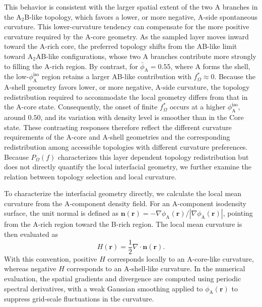This behavior is consistent with the larger spatial extent of the two A branches in the A$_2$B-like topology, which favors a lower, or more negative, A-side spontaneous curvature.
This lower-curvature tendency can compensate for the more positive curvature required by the A-core geometry.
As the sampled layer moves inward toward the A-rich core, the preferred topology shifts from the AB-like limit toward A$_2$AB-like configurations, whose two A branches contribute more strongly to filling the A-rich region.
By contrast, for $\bar{\phi}_{\mathrm A}=0.55$, where A forms the shell, the low-$\phi_{\mathrm A}^{\mathrm{iso}}$ region retains a larger AB-like contribution with $f_\Omega^\ast\approx0$.
Because the A-shell geometry favors lower, or more negative, A-side curvature, the topology redistribution required to accommodate the local geometry differs from that in the A-core state.
Consequently, the onset of finite $f_\Omega^\ast$ occurs at a higher $\phi_{\mathrm A}^{\mathrm{iso}}$, around $0.50$, and its variation with density level is smoother than in the Core state.
These contrasting responses therefore reflect the different curvature requirements of the A-core and A-shell geometries and the corresponding redistribution among accessible topologies with different curvature preferences.
Because $P_\Omega(f)$ characterizes this layer dependent topology redistribution but does not directly quantify the local interfacial geometry, we further examine the relation between topology selection and local curvature.


To characterize the interfacial geometry directly, we calculate the local mean curvature from the A-component density field.
For an A-component isodensity surface, the unit normal is defined as $\bm n(\bm r)=-\nabla\phi_{\mathrm A}(\bm r)/|\nabla\phi_{\mathrm A}(\bm r)|$, pointing from the A-rich region toward the B-rich region.
The local mean curvature is then evaluated as~\cite{Cheng2024Understand}
\begin{equation}
    H(\bm r) = \frac{1}{2}\nabla\cdot\bm n(\bm r).
\end{equation}
With this convention, positive $H$ corresponds locally to an A-core-like curvature, whereas negative $H$ corresponds to an A-shell-like curvature.
In the numerical evaluation, the spatial gradients and divergence are computed using periodic spectral derivatives, with a weak Gaussian smoothing applied to $\phi_{\mathrm A}(\bm r)$ to suppress grid-scale fluctuations in the curvature.



